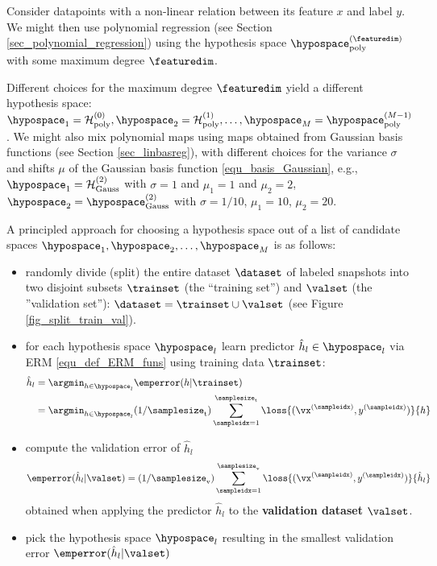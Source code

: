 \documentclass[12pt]{report}
\begin{document}
Consider datapoints with a non-linear relation between its 
feature $x$ and label $y$. We might then use polynomial 
regression (see Section \ref{sec_polynomial_regression}) 
using the hypothesis space $\hypospace_{\rm poly}^{(\featuredim)}$ 
with some maximum degree $\featuredim$. 

Different choices for the maximum degree $\featuredim$ yield 
a different hypothesis space: $\hypospace_{1} = \mathcal{H}_{\rm poly}^{(0)},\hypospace_{2} = \mathcal{H}_{\rm poly}^{(1)},\ldots,\hypospace_{M} = \hypospace_{\rm poly}^{(M-1)}$. 
We might also mix polynomial maps using maps obtained from  
Gaussian basis functions (see Section \ref{sec_linbasreg}), 
with different choices for the variance $\sigma$ and shifts $\mu$ 
of the Gaussian basis function \eqref{equ_basis_Gaussian}, 
e.g., $\hypospace_{1} = \mathcal{H}^{(2)}_{\rm Gauss}$ with $\sigma=1$ and $\mu_{1}=1$ and $\mu_{2}=2$, 
$\hypospace_{2} = \hypospace^{(2)}_{\rm Gauss}$ with $\sigma = 1/10$, $\mu_{1}=10$, $\mu_{2}= 20$.

A principled approach for choosing a hypothesis space out of a  
list of candidate spaces $\hypospace_{1},\hypospace_{2},\ldots,\hypospace_{M}$ 
is as follows: 
\begin{itemize} 
\item randomly divide (split) the entire dataset $\dataset$ of labeled snapshots into two disjoint subsets 
$\trainset$ (the ``training set'') and $\valset$ (the ''validation set''): 
$\dataset = \trainset \cup \valset$ (see Figure \ref{fig_split_train_val}). 
\item for each hypothesis space $\hypospace_{l}$ learn predictor $\hat{h}_{l} \in \hypospace_{l}$ via ERM \eqref{equ_def_ERM_funs} using training data $\trainset$:
\begin{align} 
\label{equ_def_hat_h_fitting_sel}
\hat{h}_{l} & = \argmin_{h \in \hypospace_{l}} \emperror(h| \trainset) \nonumber \\
& = \argmin_{h \in \hypospace_{l}}  (1/\samplesize_{\rm t}) \sum_{\sampleidx=1}^{\samplesize_{\rm t}} \loss{(\vx^{(\sampleidx)},y^{(\sampleidx)})}{h} %
\end{align} 
\item compute the validation error of $\hat{h}_{l}$ 
\begin{equation} 
\label{equ_def_training_val_val_modsel}
\emperror(\hat{h}_{l}|\valset) = (1/\samplesize_{\rm v}) \sum_{\sampleidx=1}^{\samplesize_{\rm v}} \loss{(\vx^{(\sampleidx)},y^{(\sampleidx)})} {\hat{h}_{l}}  %
\end{equation}  
obtained when applying the predictor $\hat{h}_{l}$ to the {\bf validation dataset} $\valset$. 
\item pick the hypothesis space $\hypospace_{l}$ resulting in the smallest validation error $\emperror(\hat{h}_{l}|\valset)$
\end{itemize} 
\end{document}
